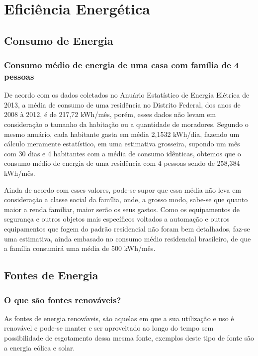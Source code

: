 \chapter{Eficiência Energética}
\section{Consumo de Energia}
\subsection{Consumo médio de energia de uma casa com família de 4 pessoas}

	De acordo com os dados coletados no Anuário Estatístico de Energia Elétrica de 2013, a média de consumo de uma residência no Distrito Federal, dos anos de 2008 à 2012, é de 217,72 kWh/mês, porém, esses dados não levam em consideração o tamanho da habitação ou a quantidade de moradores. Segundo o mesmo anuário, cada habitante gasta em média 2,1532 kWh/dia, fazendo um cálculo meramente estatístico, em uma estimativa grosseira, supondo um mês com 30 dias e 4 habitantes com a média de consumo idênticas, obtemos que o consumo médio de energia de uma residência com 4 pessoas sendo de 258,384 kWh/mês.

	Ainda de acordo com esses valores, pode-se supor que essa média não leva em consideração a classe social da família, onde, a grosso modo, sabe-se que quanto maior a renda familiar, maior serão os seus gastos. Como os equipamentos de segurança e outros objetos mais específicos voltados a automação e outros equipamentos que fogem do padrão residencial não foram bem detalhados, faz-se uma estimativa, ainda embasado no consumo médio residencial brasileiro, de que a família consumirá uma média de 500 kWh/mês.\cite{epeanuario}


\section{Fontes de Energia}

\subsection{O que são fontes renováveis?}

	As fontes de energia renováveis, são aquelas em que a sua utilização e uso
é renovável e pode-se manter e ser aproveitado ao longo do tempo sem
possibilidade de esgotamento dessa mesma fonte, exemplos deste tipo de
fonte são a energia eólica e solar.\cite{suapesquisaenergiarenovavel}

